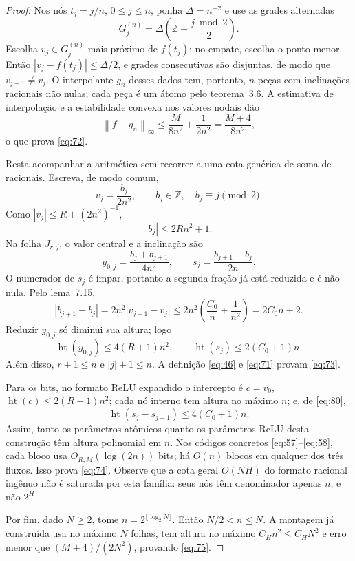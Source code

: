 \documentclass[11pt,a4paper]{article}
\theoremstyle{preciso}
\theoremstyle{definition}
\newcommand{\Z}{\mathbb Z}
\newcommand{\heightq}{\operatorname{ht}}
\newcommand{\norm}[1]{\left\|#1\right\|_{\infty}}
\newcommand{\eqn}[2]{\begin{equation}\label{eq:#1}#2\end{equation}}
\begin{document}
\begin{proof}
Nos nós $t_j=j/n$, $0\le j\le n$, ponha $\Delta=n^{-2}$ e use as grades alternadas
\eqn{76}{G_j^{(n)}=\Delta\left(\Z+\frac{j\bmod2}{2}\right).}
Escolha $v_j\in G_j^{(n)}$ mais próximo de $f(t_j)$; no empate, escolha o ponto menor. Então $|v_j-f(t_j)|\le\Delta/2$, e grades consecutivas são disjuntas, de modo que $v_{j+1}\ne v_j$. O interpolante $g_n$ desses dados tem, portanto, $n$ peças com inclinações racionais não nulas; cada peça é um átomo pelo teorema~3.6. A estimativa de interpolação e a estabilidade convexa nos valores nodais dão
\[
\norm{f-g_n}\le\frac{M}{8n^2}+\frac1{2n^2}=\frac{M+4}{8n^2},
\]
o que prova \eqref{eq:72}.

Resta acompanhar a aritmética sem recorrer a uma cota genérica de soma de racionais. Escreva, de modo comum,
\eqn{77}{v_j=\frac{b_j}{2n^2},\qquad b_j\in\Z,\quad b_j\equiv j\pmod2.}
Como $|v_j|\le R+(2n^2)^{-1}$,
\eqn{78}{|b_j|\le2Rn^2+1.}
Na folha $J_{r,j}$, o valor central e a inclinação são
\eqn{79}{y_{0,j}=\frac{b_j+b_{j+1}}{4n^2},\qquad s_j=\frac{b_{j+1}-b_j}{2n}.}
O numerador de $s_j$ é ímpar, portanto a segunda fração já está reduzida e é não nula. Pelo lema~7.15,
\eqn{80}{|b_{j+1}-b_j|=2n^2|v_{j+1}-v_j|
\le2n^2\left(\frac{C_0}n+\frac1{n^2}\right)=2C_0n+2.}
Reduzir $y_{0,j}$ só diminui sua altura; logo
\eqn{81}{\heightq(y_{0,j})\le4(R+1)n^2,\qquad\heightq(s_j)\le2(C_0+1)n.}
Além disso, $r+1\le n$ e $|j|+1\le n$. A definição \eqref{eq:46} e \eqref{eq:71} provam \eqref{eq:73}.

Para os bits, no formato ReLU expandido o intercepto é $c=v_0$, $\heightq(c)\le2(R+1)n^2$; cada nó interno tem altura no máximo $n$; e, de \eqref{eq:80},
\[
\heightq(s_j-s_{j-1})\le4(C_0+1)n.
\]
Assim, tanto os parâmetros atômicos quanto os parâmetros ReLU desta construção têm altura polinomial em $n$. Nos códigos concretos \eqref{eq:57}--\eqref{eq:58}, cada bloco usa $O_{R,M}(\log(2n))$ bits; há $O(n)$ blocos em qualquer dos três fluxos. Isso prova \eqref{eq:74}. Observe que a cota geral $O(NH)$ do formato racional ingênuo não é saturada por esta família: seus nós têm denominador apenas $n$, e não $2^H$.

Por fim, dado $N\ge2$, tome $n=2^{\lfloor\log_2N\rfloor}$. Então $N/2<n\le N$. A montagem já construída usa no máximo $N$ folhas, tem altura no máximo $C_Hn^2\le C_HN^2$ e erro menor que $(M+4)/(2N^2)$, provando \eqref{eq:75}.
\end{proof}
\end{document}
